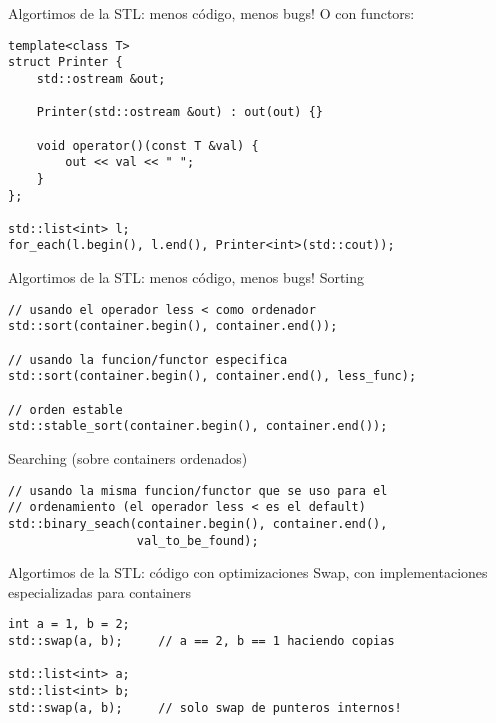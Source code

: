 \begin{frame}[fragile]{Algortimos de la STL: menos c\'odigo, menos bugs!}
O con functors:
      \begin{lstlisting}[style=normal]
template<class T>
struct Printer {
    std::ostream &out;

    Printer(std::ostream &out) : out(out) {}

    void operator()(const T &val) {
        out << val << " ";
    }
};

std::list<int> l;
for_each(l.begin(), l.end(), Printer<int>(std::cout));
      \end{lstlisting}
\end{frame}

\begin{frame}[fragile]{Algortimos de la STL: menos c\'odigo, menos bugs!}
Sorting
      \begin{lstlisting}[style=normal]
// usando el operador less < como ordenador
std::sort(container.begin(), container.end());

// usando la funcion/functor especifica
std::sort(container.begin(), container.end(), less_func); 

// orden estable
std::stable_sort(container.begin(), container.end());
      \end{lstlisting}
\vphantom{X}
Searching (sobre containers ordenados)
      \begin{lstlisting}[style=normal]
// usando la misma funcion/functor que se uso para el
// ordenamiento (el operador less < es el default)
std::binary_seach(container.begin(), container.end(), 
                  val_to_be_found); 
      \end{lstlisting}
\end{frame}



\begin{frame}[fragile]{Algortimos de la STL: c\'odigo con optimizaciones}
Swap, con implementaciones especializadas para containers
      \begin{lstlisting}[style=normal]
int a = 1, b = 2;
std::swap(a, b);     // a == 2, b == 1 haciendo copias

std::list<int> a;
std::list<int> b;
std::swap(a, b);     // solo swap de punteros internos!
      \end{lstlisting}
\end{frame}



